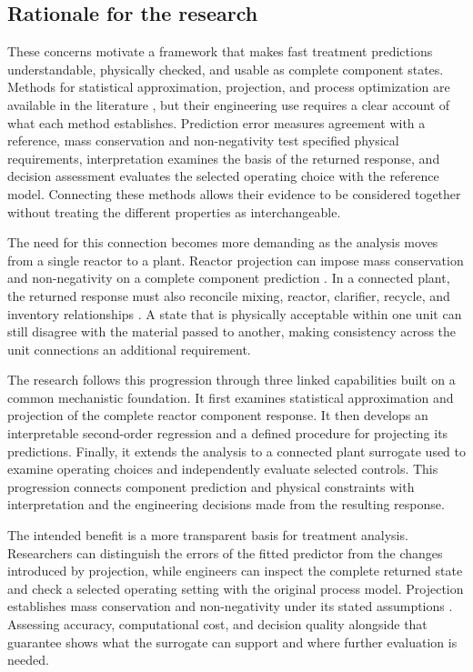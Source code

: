 \subsection{Rationale for the research}

These concerns motivate a framework that makes fast treatment predictions understandable, physically checked, and usable as complete component states. Methods for statistical approximation, projection, and process optimization are available in the literature \citep{BhosekarIerapetritou2018,KircherVotsmeier2025,Durkin2024}, but their engineering use requires a clear account of what each method establishes. Prediction error measures agreement with a reference, mass conservation and non-negativity test specified physical requirements, interpretation examines the basis of the returned response, and decision assessment evaluates the selected operating choice with the reference model. Connecting these methods allows their evidence to be considered together without treating the different properties as interchangeable.

The need for this connection becomes more demanding as the analysis moves from a single reactor to a plant. Reactor projection can impose mass conservation and non-negativity on a complete component prediction \citep{Selerio2026}. In a connected plant, the returned response must also reconcile mixing, reactor, clarifier, recycle, and inventory relationships \citep{Alex2008,JeppssonDiehl1996}. A state that is physically acceptable within one unit can still disagree with the material passed to another, making consistency across the unit connections an additional requirement.

The research follows this progression through three linked capabilities built on a common mechanistic foundation. It first examines statistical approximation and projection of the complete reactor component response. It then develops an interpretable second-order regression and a defined procedure for projecting its predictions. Finally, it extends the analysis to a connected plant surrogate used to examine operating choices and independently evaluate selected controls. This progression connects component prediction and physical constraints with interpretation and the engineering decisions made from the resulting response.

The intended benefit is a more transparent basis for treatment analysis. Researchers can distinguish the errors of the fitted predictor from the changes introduced by projection, while engineers can inspect the complete returned state and check a selected operating setting with the original process model. Projection establishes mass conservation and non-negativity under its stated assumptions \citep{KircherVotsmeier2025,Selerio2026}. Assessing accuracy, computational cost, and decision quality alongside that guarantee shows what the surrogate can support and where further evaluation is needed.

